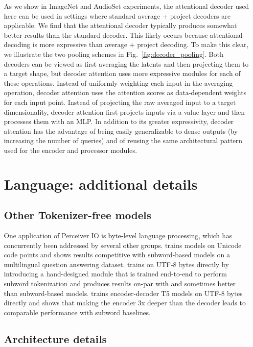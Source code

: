 \documentclass{article} \usepackage{iclr2022_conference,times}
\newcommand{\ourmodel}{Perceiver IO\xspace}
\begin{document}
As we show in ImageNet and AudioSet experiments, the attentional decoder used here can be used in settings where standard average + project decoders are applicable. We find that the attentional decoder typically produces somewhat better results than the standard decoder. This likely occurs because attentional decoding is more expressive than average + project decoding. To make this clear, we illustrate the two pooling schemes in Fig.~\ref{fig:decoder_pooling}. Both decoders can be viewed as first averaging the latents and then projecting them to a target shape, but decoder attention uses more expressive modules for each of these operations. Instead of uniformly weighting each input in the averaging operation, decoder attention uses the attention scores as data-dependent weights for each input point. Instead of projecting the raw averaged input to a target dimensionality, decoder attention first projects inputs via a value layer and then processes them with an MLP. In addition to its greater expressivity, decoder attention has the advantage of being easily generalizable to dense outputs (by increasing the number of queries) and of reusing the same architectural pattern used for the encoder and processor modules.

\section{Language: additional details}

\subsection{Other Tokenizer-free models}
One application of \ourmodel{} is byte-level language processing, which has concurrently been addressed by several other groups. \cite{clark2021canine} trains models on Unicode code points and shows results competitive with subword-based models on a multilingual question answering dataset. \cite{tay2021charformer} trains on UTF-8 bytes directly by introducing a hand-designed module that is trained end-to-end to perform subword tokenization and produces results on-par with and sometimes better than subword-based models. \cite{xue2021byt5} trains encoder-decoder T5 models on UTF-8 bytes directly and shows that making the encoder 3x deeper than the decoder leads to comparable performance with subword baselines.

\subsection{Architecture details}
\label{ref:language_arch_appendix}
\end{document}
